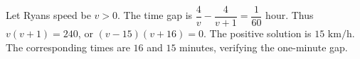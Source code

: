 Let Ryan\textquotesingle s speed be $v>0$. The time gap is $\dfrac{4}{v}-\dfrac{4}{v+1}=\dfrac{1}{60}$ hour. Thus $v(v+1)=240$, or $(v-15)(v+16)=0$. The positive solution is $\boxed{15\text{ km/h}}$. The corresponding times are $16$ and $15$ minutes, verifying the one-minute gap.
